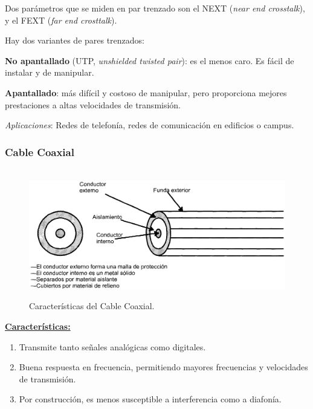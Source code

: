 \documentclass[10pt,a4paper]{article}
\begin{document}
Dos parámetros que se miden en par trenzado son el NEXT (\textit{near end crosstalk}), y el FEXT (\textit{far end crosttalk}).

Hay dos variantes de pares trenzados:
\begin{description}
\item \textbf{No apantallado} (UTP, \textit{unshielded twisted pair}): es el menos caro. Es fácil de instalar y de manipular.
\item \textbf{Apantallado}: más difícil y costoso de manipular, pero proporciona mejores prestaciones a altas velocidades de transmisión.
\end{description}

\vspace{10pt}

\textit{Aplicaciones}: Redes de telefonía, redes de comunicación en edificios o campus.

\subsubsection{Cable Coaxial}

\begin{figure}[ht!]
  \caption{Características del Cable Coaxial.}
  \label{fig:cable_coaxial}  
  \centering
  \hbox{
	\includegraphics[width=\textwidth-\fboxrule-\fboxrule]{imgs/cable_coaxial.png}}
\end{figure}

\underline{\textbf{Características:}}
\begin{enumerate}[+]
\item Transmite tanto señales analógicas como digitales.
\item Buena respuesta en frecuencia, permitiendo mayores frecuencias y velocidades de transmisión.
\item Por construcción, es menos susceptible a interferencia como a diafonía.
\end{enumerate}
\end{document}
